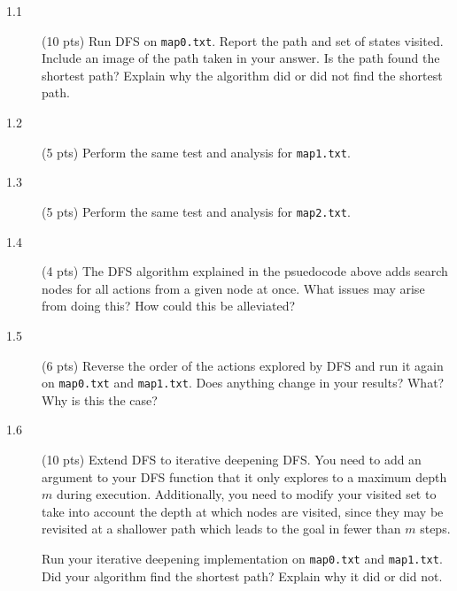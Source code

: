 \documentclass[11pt]{hermans-hw}
\begin{document}
\begin{description}
\item[1.1] (10 pts) Run DFS on \texttt{map0.txt}. Report the path and set of states visited. Include an image of the path taken in your answer.
Is the path found the shortest path? Explain why the algorithm did or did not find the shortest path.
\item[1.2] (5 pts) Perform the same test and analysis for \texttt{map1.txt}.
\item[1.3] (5 pts) Perform the same test and analysis for \texttt{map2.txt}.
\item[1.4] (4 pts) The DFS algorithm explained in the psuedocode above adds search nodes for all actions from a given node at once. What issues may arise from doing this? How could this be alleviated?
\item[1.5] (6 pts) Reverse the order of the actions explored by DFS and run it again on  \texttt{map0.txt} and \texttt{map1.txt}. Does anything change in your results? What? Why is this the case?
\item[1.6] (10 pts) Extend DFS to iterative deepening DFS. You need to add an argument to your DFS function that it only explores to a maximum depth \(m\) during execution. Additionally, you need to modify your visited set to take into account the depth at which nodes are visited, since they may be revisited at a shallower path which leads to the goal in fewer than \(m\) steps.

Run your iterative deepening implementation on \texttt{map0.txt} and \texttt{map1.txt}. Did your algorithm find the shortest path? Explain why it did or did not. 

\end{description}
\end{document}
